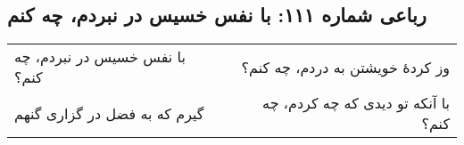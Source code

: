 \begin{center}
\section*{رباعی شماره ۱۱۱: با نفس خسیس در نبردم، چه کنم}
\label{sec:111}
\begin{longtable}{l p{0.5cm} r}
با نفس خسیس در نبردم، چه کنم؟
&&
وز کردهٔ خویشتن به دردم، چه کنم؟
\\
گیرم که به فضل در گزاری گنهم
&&
با آنکه تو دیدی که چه کردم، چه کنم؟
\\
\end{longtable}
\end{center}
